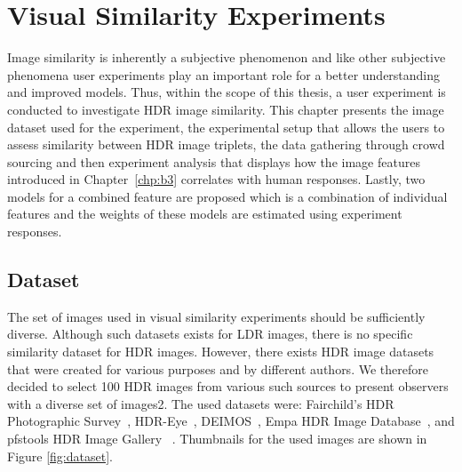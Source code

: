 \chapter{Visual Similarity Experiments}
\label{chp:b4}

Image similarity is inherently a subjective phenomenon and like other subjective phenomena user experiments play an important role for a better understanding and improved models. Thus, within the scope of this thesis, a user experiment is conducted to investigate HDR image similarity. This chapter presents the image dataset used for the experiment, the experimental setup that allows the users to assess similarity between HDR image triplets, the data gathering through crowd sourcing and then experiment analysis that displays how the image features introduced in Chapter~\ref{chp:b3} correlates with human responses. Lastly, two models for a combined feature are proposed which is a combination of individual features and the weights of these models are estimated using experiment responses.

\section{Dataset}

The set of images used in visual similarity experiments should be sufficiently diverse. Although such datasets exists for LDR images, there is no specific similarity dataset for HDR images. However, there exists HDR image datasets that were created for various purposes and by different authors. We therefore decided to select 100 HDR images from various such sources to present observers with a diverse set of images2. The used datasets were: Fairchild’s HDR Photographic Survey~\cite{fairchild2007hdr}, HDR-Eye~\cite{nemoto2015visual}, DEIMOS~\cite{klima2011deimos}, Empa HDR Image Database~\cite{EmpaHDR}, and pfstools HDR Image Gallery ~\cite{mantiuk2007high}. Thumbnails for the used images are shown in Figure \ref{fig:dataset}.

